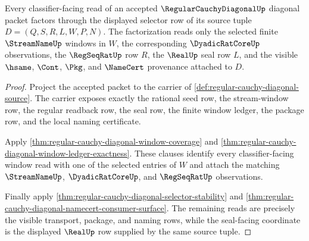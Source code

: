 \begin{theorem}
\label{thm:regular-cauchy-diagonal-selector-fiber-exhaustion}
Every classifier-facing read of an accepted $\RegularCauchyDiagonalUp$ diagonal packet factors through the displayed selector row of its source tuple $D=(Q,S,R,L,W,P,N)$. The factorization reads only the selected finite $\StreamNameUp$ windows in $W$, the corresponding $\DyadicRatCoreUp$ observations, the $\RegSeqRatUp$ row $R$, the $\RealUp$ seal row $L$, and the visible $\hsame$, $\Cont$, $\Pkg$, and $\NameCert$ provenance attached to $D$.
\end{theorem}
\begin{proof}
Project the accepted packet to the carrier of \autoref{def:regular-cauchy-diagonal-source}. The carrier exposes exactly the rational seed row, the stream-window row, the regular readback row, the seal row, the finite window ledger, the package row, and the local naming certificate.

Apply \autoref{thm:regular-cauchy-diagonal-window-coverage} and \autoref{thm:regular-cauchy-diagonal-window-ledger-exactness}. These clauses identify every classifier-facing window read with one of the selected entries of $W$ and attach the matching $\StreamNameUp$, $\DyadicRatCoreUp$, and $\RegSeqRatUp$ observations.

Finally apply \autoref{thm:regular-cauchy-diagonal-selector-stability} and \autoref{thm:regular-cauchy-diagonal-namecert-consumer-surface}. The remaining reads are precisely the visible transport, package, and naming rows, while the seal-facing coordinate is the displayed $\RealUp$ row supplied by the same source tuple.
\end{proof}

